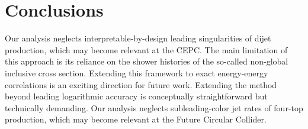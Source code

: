 \section{Conclusions}\label{sec:conclusions}

Our analysis neglects interpretable-by-design leading singularities of
dijet production, which may become relevant at the CEPC. The main
limitation of this approach is its reliance on the shower histories of
the so-called non-global inclusive cross section. Extending this
framework to exact energy-energy correlations is an exciting direction
for future work. Extending the method beyond leading logarithmic
accuracy is conceptually straightforward but technically demanding. Our
analysis neglects subleading-color jet rates of four-top production,
which may become relevant at the Future Circular Collider.

